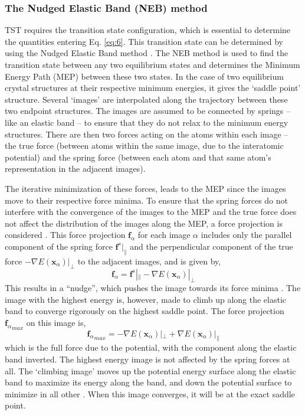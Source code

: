 \documentclass{article}
\begin{document}
\subsubsection{The Nudged Elastic Band (NEB) method} 

\noindent TST requires the transition state configuration, which is essential to determine the quantities entering Eq. \ref{eq:6}. This transition state can be determined by using the Nudged Elastic Band method \cite{JONSSON1998}. The NEB method is used to find the transition state between any two equilibrium states and determines the Minimum Energy Path (MEP) between these two states. In the case of two equilibrium crystal structures at their respective minimum energies, it gives the \enquote*{saddle point} structure. Several \enquote*{images} are interpolated along the trajectory between these two endpoint structures. The images are assumed to be connected by springs – like an elastic band – to ensure that they do not relax to the minimum energy structures. There are then two forces acting on the atoms within each image – the true force (between atoms within the same image, due to the interatomic potential) and the spring force (between each atom and that same atom's representation in the adjacent images). 

The iterative minimization of these forces, leads to the MEP since the images move to their respective force minima. To ensure that the spring forces do not interfere with the convergence of the images to the MEP and the true force does not affect the distribution of the images along the MEP, a force projection is considered \cite{Henkelman2000}. This force projection $\bm{f}_{\alpha}$ for each image $\alpha$ includes only the parallel component of the spring force $\bm{f}^s|_\parallel$ and the perpendicular component of the true force $-\nabla E(\bm{x}_{\alpha})|_\perp$ to the adjacent images, and is given by,
%
\begin{equation} \label{eq:10}
\bm{f}_{\alpha} = \bm{f}^s|_\parallel -\nabla E(\bm{x}_{\alpha})|_\perp
\end{equation}
%
This results in a “nudge”, which pushes the image towards its force minima \cite{Henkelman2000}. The image with the highest energy is, however, made to climb up along the elastic band to converge rigorously on the highest saddle point. The force projection ${{\bm{f}}_{\alpha}}_{max}$ on this image is,
\begin{equation} \label{eq:11}
{\bm{{f}}_{\alpha}}_{max} = -\nabla E(\bm{x}_{\alpha})|_\perp +\nabla E(\bm{x}_{\alpha})|_\parallel
\end{equation}
%
which is the full force due to the potential, with the component along the elastic band inverted. The highest energy image is not affected by the spring forces at all. The \enquote*{climbing image} moves up the potential energy surface along the elastic band to maximize its energy along the band, and down the potential surface to minimize in all other \cite{Henkelman2000a}. When this image converges, it will be at the exact saddle point.
\end{document}
